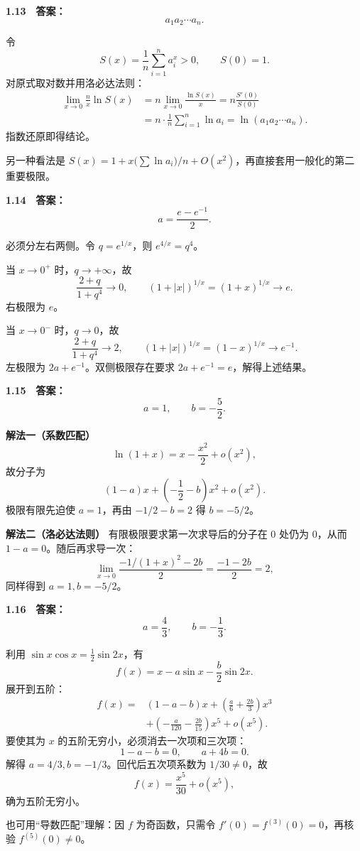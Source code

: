 \begin{solutionBox}
\textbf{1.13　答案：}
\[
\boxed{a_1a_2\cdots a_n}.
\]

令
\[
S(x)=\frac1n\sum_{i=1}^n a_i^x>0,
\qquad S(0)=1.
\]
对原式取对数并用洛必达法则：
\[
\begin{aligned}
\lim_{x\to0}\frac n x\ln S(x)
&=n\lim_{x\to0}\frac{\ln S(x)}x
=n\frac{S'(0)}{S(0)}\\
&=n\cdot\frac1n\sum_{i=1}^n\ln a_i
=\ln(a_1a_2\cdots a_n).
\end{aligned}
\]
指数还原即得结论。

另一种看法是 \(S(x)=1+x\bigl(\sum\ln a_i\bigr)/n+O(x^2)\)，再直接套用一般化的第二重要极限。
\end{solutionBox}

\begin{solutionBox}
\textbf{1.14　答案：}
\[
\boxed{a=\frac{e-e^{-1}}2}.
\]

必须分左右两侧。令 \(q=e^{1/x}\)，则 \(e^{4/x}=q^4\)。

当 \(x\to0^+\) 时，\(q\to+\infty\)，故
\[
\frac{2+q}{1+q^4}\to0,
\qquad
(1+|x|)^{1/x}=(1+x)^{1/x}\to e.
\]
右极限为 \(e\)。

当 \(x\to0^-\) 时，\(q\to0\)，故
\[
\frac{2+q}{1+q^4}\to2,
\qquad
(1+|x|)^{1/x}=(1-x)^{1/x}\to e^{-1}.
\]
左极限为 \(2a+e^{-1}\)。双侧极限存在要求
\(2a+e^{-1}=e\)，解得上述结果。
\end{solutionBox}

\begin{solutionBox}
\textbf{1.15　答案：}
\[
\boxed{a=1,\qquad b=-\frac52}.
\]

\textbf{解法一（系数匹配）}
\[
\ln(1+x)=x-\frac{x^2}{2}+o(x^2),
\]
故分子为
\[
(1-a)x+\left(-\frac12-b\right)x^2+o(x^2).
\]
极限有限先迫使 \(a=1\)，再由
\(-1/2-b=2\) 得 \(b=-5/2\)。

\textbf{解法二（洛必达法则）}
有限极限要求第一次求导后的分子在 \(0\) 处仍为 \(0\)，从而
\(1-a=0\)。随后再求导一次：
\[
\lim_{x\to0}\frac{-1/(1+x)^2-2b}{2}
=\frac{-1-2b}{2}=2,
\]
同样得到 \(a=1,b=-5/2\)。
\end{solutionBox}

\begin{solutionBox}
\textbf{1.16　答案：}
\[
\boxed{a=\frac43,\qquad b=-\frac13}.
\]

利用 \(\sin x\cos x=\frac12\sin2x\)，有
\[
f(x)=x-a\sin x-\frac b2\sin2x.
\]
展开到五阶：
\[
\begin{aligned}
f(x)
={}&(1-a-b)x
+\left(\frac a6+\frac{2b}{3}\right)x^3\\
&+\left(-\frac a{120}-\frac{2b}{15}\right)x^5+o(x^5).
\end{aligned}
\]
要使其为 \(x\) 的五阶无穷小，必须消去一次项和三次项：
\[
1-a-b=0,
\qquad
a+4b=0.
\]
解得 \(a=4/3,b=-1/3\)。回代后五次项系数为 \(1/30\ne0\)，故
\[
f(x)=\frac{x^5}{30}+o(x^5),
\]
确为五阶无穷小。

也可用“导数匹配”理解：因 \(f\) 为奇函数，只需令
\(f'(0)=f^{(3)}(0)=0\)，再核验 \(f^{(5)}(0)\ne0\)。
\end{solutionBox}


